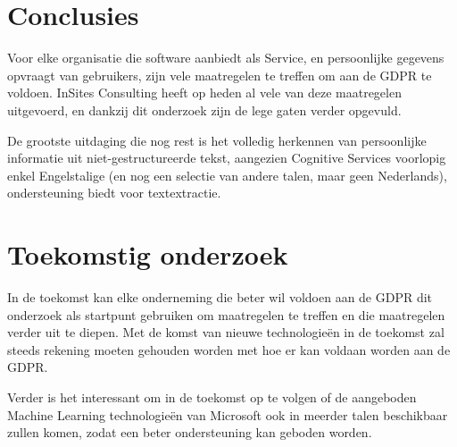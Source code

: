 \documentclass[a0,portrait]{a0poster}
\begin{document}
\begin{multicols}{2}



\color{HoGentAccent1} 
\section*{Conclusies}
\color{black}
Voor elke organisatie die software aanbiedt als Service, en persoonlijke gegevens opvraagt van gebruikers, zijn vele maatregelen te treffen om aan de GDPR te voldoen. InSites Consulting heeft op heden al vele van deze maatregelen uitgevoerd, en dankzij dit onderzoek zijn de lege gaten verder opgevuld. 

De grootste uitdaging die nog rest is het volledig herkennen van persoonlijke informatie uit niet-gestructureerde tekst, aangezien Cognitive Services voorlopig enkel Engelstalige (en nog een selectie van andere talen, maar geen Nederlands), ondersteuning biedt voor textextractie. 
\color{HoGentAccent1} 
\section*{Toekomstig onderzoek}
\color{black}

In de toekomst kan elke onderneming die beter wil voldoen aan de GDPR dit onderzoek als startpunt gebruiken om maatregelen te treffen en die maatregelen verder uit te diepen. Met de komst van nieuwe technologieën in de toekomst zal steeds rekening moeten gehouden worden met hoe er kan voldaan worden aan de GDPR. 

Verder is het interessant om in de toekomst op te volgen of de aangeboden Machine Learning technologieën van Microsoft ook in meerder talen beschikbaar zullen komen, zodat een beter ondersteuning kan geboden worden. 



\end{multicols}
\end{document}
